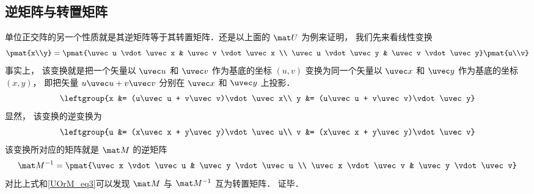 \subsection{逆矩阵与转置矩阵}
单位正交阵的另一个性质就是其逆矩阵等于其转置矩阵．还是以上面的 $\mat U$ 为例来证明， 我们先来看线性变换
\begin{equation}
\pmat{x\\y} = \pmat{\uvec u \vdot \uvec x & \uvec v \vdot \uvec x \\
\uvec u \vdot \uvec y & \uvec v \vdot \uvec y} \pmat{u\\v}
\end{equation}
事实上， 该变换就是把一个矢量以 $\uvec u$ 和 $\uvec v$ 作为基底的坐标 $(u, v)$ 变换为同一个矢量以 $\uvec x$ 和 $\uvec y$ 作为基底的坐标 $(x, y)$， 即把矢量 $u\uvec u + v\uvec v$ 分别在 $\uvec x$ 和 $\uvec y$ 上投影．
\begin{equation}
\leftgroup{x &= (u\uvec u + v\uvec v)\vdot\uvec x\\
y &= (u\uvec u + v\uvec v)\vdot\uvec y}
\end{equation}
显然， 该变换的逆变换为
\begin{equation}
\leftgroup{u &= (x\uvec x + y\uvec y)\vdot\uvec u\\
v &= (x\uvec x + y\uvec y)\vdot\uvec v}
\end{equation}
该变换所对应的矩阵就是 $\mat M$ 的逆矩阵
\begin{equation}
\mat M^{-1} = \pmat{\uvec x \vdot \uvec u & \uvec y \vdot \uvec u \\
\uvec x \vdot \uvec v & \uvec y \vdot \uvec v}
\end{equation}
对比上式和\autoref{UOrM_eq3}可以发现 $\mat M$ 与 $\mat M^{-1}$ 互为转置矩阵． 证毕．




